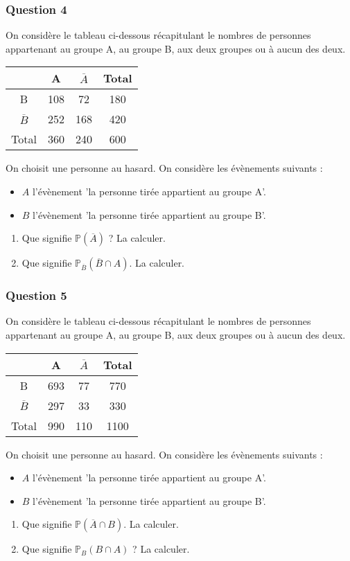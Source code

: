 \documentclass[15pt, mathserif]{beamer}
\begin{document}
\begin{frame} 
	\frametitle{Question 4}
On considère le tableau ci-dessous récapitulant le nombres de personnes appartenant au groupe A, au groupe B, aux deux groupes ou à aucun des deux.\begin{center} 
 \begin{tabular}{|c|c|c|c|} 
 \cline{2-4} 
 \multicolumn{1}{c|}{} & A & $\overline{A}$ & Total \\\hline 
 B   &108  &72& 180 \\\hline 
 $\overline{B}$   &252 & 168 & 420 \\\hline 
 Total   &360&240 &600 \\\hline  
 \end{tabular} 
 \end{center} On choisit une personne au hasard. On considère les évènements suivants : 
 \begin{itemize} 
 \item $A$ l'évènement 'la personne tirée appartient au groupe A'. 
 \item $B$ l'évènement 'la personne tirée appartient au groupe B'. 
 \end{itemize} 
 \begin{enumerate} 
 \item Que signifie $\mathbb{P}(\overline{A})$ ? La calculer. 
 \item Que signifie $\mathbb{P}_{\overline{B}} (\overline{B} \cap A)$. La calculer. 
  \end{enumerate} 
 \end{frame}


\begin{frame} 
	\frametitle{Question 5}
On considère le tableau ci-dessous récapitulant le nombres de personnes appartenant au groupe A, au groupe B, aux deux groupes ou à aucun des deux.\begin{center} 
 \begin{tabular}{|c|c|c|c|} 
 \cline{2-4} 
 \multicolumn{1}{c|}{} & A & $\overline{A}$ & Total \\\hline 
 B   &693  &77& 770 \\\hline 
 $\overline{B}$   &297 & 33 & 330 \\\hline 
 Total   &990&110 &1100 \\\hline  
 \end{tabular} 
 \end{center} On choisit une personne au hasard. On considère les évènements suivants : 
 \begin{itemize} 
 \item $A$ l'évènement 'la personne tirée appartient au groupe A'. 
 \item $B$ l'évènement 'la personne tirée appartient au groupe B'. 
 \end{itemize} 
 \begin{enumerate} 
 \item Que signifie $\mathbb{P}(\overline{A} \cap B)$. La calculer. 
 \item Que signifie $\mathbb{P}_{B} (B \cap A)$ ? La calculer. 
  \end{enumerate} 
 \end{frame}
\end{document}
